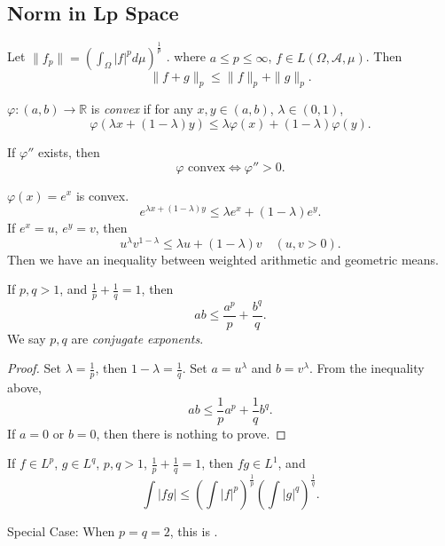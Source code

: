 
\subsection{Norm in Lp Space}

\begin{theorem}
	Let $\|f_p\|  = \left( \int _\Omega \left| f \right| ^p d \mu \right)^{\frac{1}{p}}$ .
	where $a \le p \le \infty $, $f \in L(\Omega, \mathcal{A},\mu)$.
	Then
	\[
		\|f + g\|_p \le \|f\|_p + \|g\|_p
	.\] 
\end{theorem}

\begin{definition}[Convexity]
	$\varphi:(a, b) \to \mathbb{R}$ is \textit{convex} if for any $x, y \in (a, b)$, $\lambda \in (0,1)$,
	\[
		\varphi(\lambda x + (1 - \lambda) y) \le  \lambda \varphi(x) + (1 - \lambda) \varphi(y)
	.\] 
\end{definition}

If $\varphi''$ exists, then
\[
	\varphi \text{ convex} \iff \varphi'' > 0
.\] 

\begin{example}
	$\varphi(x) = e^x$ is convex.
	\[
		e^{\lambda x + (1 - \lambda) y} \le  \lambda e^x + (1 - \lambda) e^{y}
	.\] 
	If $e^x = u$, $e^y = v$, then
	\[
		u^\lambda v ^{1 - \lambda} \le  \lambda u + (1 - \lambda) v \quad (u , v > 0)
	.\] 
	Then we have an inequality between weighted arithmetic and geometric means.
\end{example}

\begin{proposition}
	If $p, q>1$, and $\frac{1}{p} + \frac{1}{q} = 1$, then 
	\[
		a b \le \frac{a^p}{p} + \frac{b^q}{q}
	.\] 
	We say $p, q$ are \textit{conjugate exponents}.
\end{proposition}
\begin{proof}
	Set $\lambda = \frac{1}{p}$, then $1 - \lambda = \frac{1}{q}$. Set $a = u^\lambda$ and $b = v^\lambda$. From the inequality above,
	\[
		ab \le  \frac{1}{p} a^p + \frac{1}{q} b^q
	.\] 
	If $a = 0$ or $b=0$, then there is nothing to prove.
\end{proof}

\begin{proposition}
	If $f \in L^p$, $g \in L^q$, $p, q > 1$, $\frac{1}{p} + \frac{1}{q } = 1$, then $fg \in L^1$, and
	\[
		\int |fg| \le \left( \int |f|^p \right) ^{\frac{1}{p}} \left( \int |g|^q \right) ^{\frac{1}{q}}
	.\] 
\end{proposition}
Special Case: When $p = q = 2$, this is .

